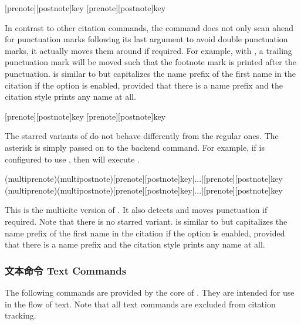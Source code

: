 \begin{ltxsyntax}

[prenote][postnote]{key}
[prenote][postnote]{key}

In contrast to other citation commands, the  command does not only scan ahead for punctuation marks following its last argument to avoid double punctuation marks, it actually moves them around if required. For example, with , a trailing punctuation mark will be moved such that the footnote mark is printed after the punctuation.  is similar to  but capitalizes the name prefix of the first name in the citation if the  option is enabled, provided that there is a name prefix and the citation style prints any name at all.

[prenote][postnote]{key}
[prenote][postnote]{key}

The starred variants of  do not behave differently from the regular ones. The asterisk is simply passed on to the backend command. For example, if  is configured to use , then  will execute .

(multiprenote)(multipostnote)[prenote][postnote]{key}|...|[prenote][postnote]{key}
(multiprenote)(multipostnote)[prenote][postnote]{key}|...|[prenote][postnote]{key}

This is the multicite version of . It also detects and moves punctuation if required. Note that there is no starred variant.  is similar to  but capitalizes the name prefix of the first name in the citation if the  option is enabled, provided that there is a name prefix and the citation style prints any name at all.

\end{ltxsyntax}

\subsubsection{文本命令 Text Commands}
\label{use:cit:txt}

The following commands are provided by the core of \biblatex. They are intended for use in the flow of text. Note that all text commands are excluded from citation tracking.

